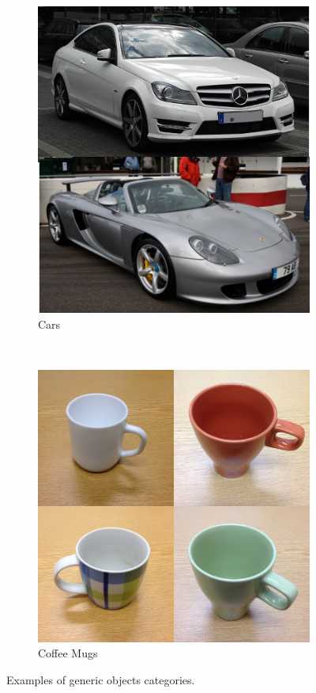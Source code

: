 \documentclass[12pt,final,twoside]{report}
\theoremstyle{plain}
\theoremstyle{definition}
\theoremstyle{remark}
\begin{document}
\begin{figure}[tbhp]
  \centering
  \begin{subfigure}[b]{.45\textwidth}
    \includegraphics[width=.89\textwidth]{cars} %
    \caption{Cars\footnotemark}
  \end{subfigure}
  ~
  \begin{subfigure}[b]{.45\textwidth}
    \centering
    \includegraphics[width=\textwidth]{mugs}
    \caption{Coffee Mugs}
  \end{subfigure}
  \caption{Examples of generic objects categories.}
  \label{fig:generic}
\end{figure}
\end{document}

